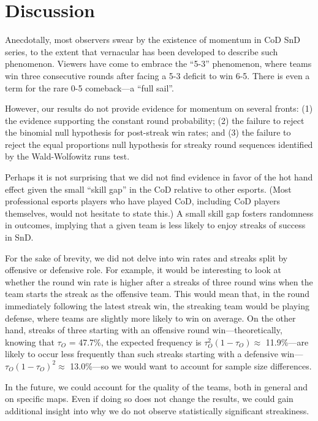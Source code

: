 \documentclass{article}
\begin{document}
\hypertarget{discussion}{%
\section{Discussion}\label{discussion}}

Anecdotally, most observers swear by the existence of momentum in CoD
SnD series, to the extent that vernacular has been developed to describe
such phenomenon. Viewers have come to embrace the ``5-3'' phenomenon,
where teams win three consecutive rounds after facing a 5-3 deficit to
win 6-5. There is even a term for the rare 0-5 comeback---a ``full
sail''.

However, our results do not provide evidence for momentum on several
fronts: (1) the evidence supporting the constant round probability; (2)
the failure to reject the binomial null hypothesis for post-streak win
rates; and (3) the failure to reject the equal proportions null
hypothesis for streaky round sequences identified by the Wald-Wolfowitz
runs test.

Perhaps it is not surprising that we did not find evidence in favor of
the hot hand effect given the small ``skill gap'' in the CoD relative to
other esports. (Most professional esports players who have played CoD,
including CoD players themselves, would not hesitate to state this.) A
small skill gap fosters randomness in outcomes, implying that a given
team is less likely to enjoy streaks of success in SnD.

For the sake of brevity, we did not delve into win rates and streaks
split by offensive or defensive role. For example, it would be
interesting to look at whether the round win rate is higher after a
streaks of three round wins when the team starts the streak as the
offensive team. This would mean that, in the round immediately following
the latest streak win, the streaking team would be playing defense,
where teams are slightly more likely to win on average. On the other
hand, streaks of three starting with an offensive round
win---theoretically, knowing that \(\tau_O\) = 47.7\%, the expected
frequency is \(\tau_O^2 (1 - \tau_O) \approx\) 11.9\%---are likely to
occur less frequently than such streaks starting with a defensive
win---\(\tau_O (1 - \tau_O)^2 \approx\) 13.0\%---so we would want to
account for sample size differences.

In the future, we could account for the quality of the teams, both in
general and on specific maps. Even if doing so does not change the
results, we could gain additional insight into why we do not observe
statistically significant streakiness.
\end{document}
